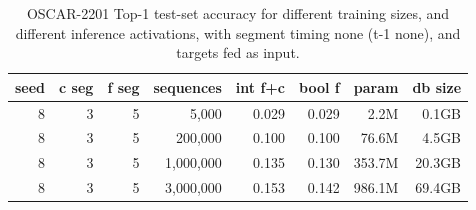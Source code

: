 

\begin{table}[H]
\centering
\caption{OSCAR-2201 Top-1 test-set accuracy for different training sizes, and different inference activations, with segment timing none (t-1 none), and targets fed as input.}
\label{tab:oscar-test-top1-accuracy-spacyPipelineOptimisations-trainsize}
\begin{tabular}{rrrrrrrr}
\toprule
\textbf{seed} & \textbf{c seg} & \textbf{f seg} & \textbf{sequences} & \textbf{int f+c} & \textbf{bool f} & \textbf{param} & \textbf{db size} \\
\midrule
8 & 3 & 5 & 5,000     & 0.029 & 0.029 & 2.2M & 0.1GB \\
8 & 3 & 5 & 200,000   & 0.100 & 0.100 & 76.6M & 4.5GB \\
8 & 3 & 5 & 1,000,000 & 0.135 & 0.130 & 353.7M & 20.3GB \\
8 & 3 & 5 & 3,000,000 & 0.153 & 0.142 & 986.1M & 69.4GB \\
\bottomrule
\end{tabular}
\end{table}

